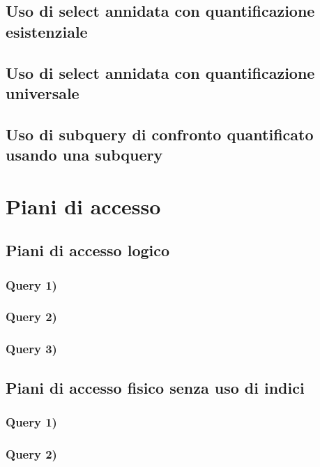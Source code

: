 \documentclass[a4paper,12pt]{article}
\begin{document}
 \subsection{ Uso di select annidata con quantificazione esistenziale }
 \subsection{ Uso di select annidata con quantificazione universale }
 \subsection{ Uso di subquery di confronto quantificato usando una subquery }



 \section{ Piani di accesso }

 \subsection{ Piani di accesso logico }

 \subsubsection{ Query 1) }

 \subsubsection{ Query 2) }

 \subsubsection{ Query 3) }

 \subsection{ Piani di accesso fisico senza uso di indici }

 \subsubsection{ Query 1) }

 \subsubsection{ Query 2) }
\end{document}
